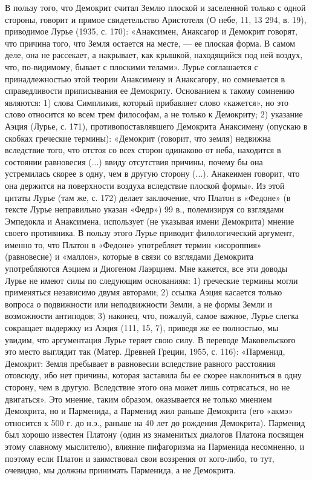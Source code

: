 В пользу того, что Демокрит считал Землю плоской и заселенной только с
одной  стороны, говорит  и  прямое свидетельство  Аристотеля (О  небе,
11,  13 294,  в. 19),  приводимое  Лурье (1935,  с. 170):  «Анаксимен,
Анаксагор и Демокрит говорят, что  причина того, что Земля остается на
месте,  --- ее  плоская  форма.  В самом  деле,  она  не рассекает,  а
накрывает, как крышкой, находящийся  под ней воздух, что, по-видимому,
бывает с  плоскими телами».  Лурье соглашается с  принадлежностью этой
теории  Анаксимену  и  Анаксагору,  но  сомневается  в  справедливости
приписывания ее  Демокриту. Основанием к такому  сомнению являются: 1)
слова  Симпликия, который  прибавляет  слово «кажется»,  но это  слово
относится ко всем трем философам, а не только к Демокриту; 2) указание
Аэция  (Лурье,  с.  171),  противопоставлявшего  Демокрита  Анаксимену
(опускаю в скобках греческие  термины): «Демокрит (говорит, что земля)
недвижна вследствие того, что отстоя со всех сторон одинаково от неба,
находится  в  состоянии  равновесия (...)  ввиду  отсутствия  причины,
почему бы она  устремилась скорее в одну, чем в  другую сторону (...).
Анакеимен говорит, что она  держится на поверхности воздуха вследствие
плоской  формы».  Из  этой  цитаты  Лурье  (там  же,  с.  172)  делает
заключение, что Платон  в «Федоне» (в тексте  Лурье неправильно указан
«Федр»)  99  в.,  полемизируя  со взглядами  Эмпедокла  и  Анаксимена,
использует (не  указывая имени Демокрита) мнение  своего противника. В
пользу этого  Лурье приводит  филологический аргумент, именно  то, что
Платон  в  «Федоне»  употребляет  термин  «исороппия»  (равновесие)  и
«маллон», которые в связи  со взглядами Демокрита употребляются Аэцием
и Диогеном Лаэрцием.  Мне кажется, все эти доводы Лурье  не имеют силы
по  следующим  основаниям:  1)  греческие  термины  могли  применяться
независимо двумя авторами;  2) ссылка Аэция касается  только вопроса о
подвижности или  неподвижности Земли, а  не формы Земли  и возможности
антиподов;  3)  наконец,  что,  пожалуй, самое  важное,  Лурье  слегка
сокращает выдержку  из Аэция  (111, 15, 7),  приведя же  ее полностью,
мы  увидим,  что  аргументация  Лурье теряет  свою  силу.  В  переводе
Маковельского это место выглядит так  (Матер. Древней Греции, 1955, с.
116):  «Парменид, Демокрит:  Земля пребывает  в равновесии  вследствие
равного расстояния отовсюду, ибо нет  причины, которая заставила бы ее
скорее наклониться в одну сторону,  чем в другую. Вследствие этого она
может лишь сотрясаться,  но не двигаться». Это  мнение, таким образом,
оказывается не  только мнением Демокрита,  но и Парменида,  а Парменид
жил раньше  Демокрита (его «акмэ» относится  к 500 г. до  н.э., раньше
на  40  лет  до  рождения Демокрита).  Парменид  был  хорошо  известен
Платону (один  из знаменитых диалогов Платона  посвящен этому славному
мыслителю),  влияние пифагоризма  на Парменида  несомненно, и  поэтому
если  Платон  и  заимствовал  свои воззрения  от  кого-либо,  то  тут,
очевидно, мы должны принимать Парменида, а не Демокрита.


